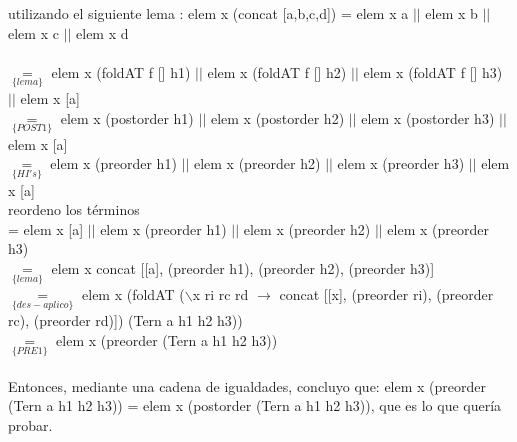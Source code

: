 \documentclass[10pt,a4paper]{article}
\begin{document}
utilizando el siguiente lema : elem x (concat [a,b,c,d]) = elem x a $||$ elem x b $||$ elem x c $||$ elem x d \\
\\
\noindent
$\underset{\{lema\}}{=}$ elem x (foldAT f [] h1) $||$ elem x (foldAT f [] h2) $||$ elem x (foldAT f [] h3) $||$ elem x [a] \\
$\underset{\{POST1\}}{=}$ elem x (postorder h1) $||$ elem x (postorder h2) $||$ elem x (postorder h3) $||$ elem x [a] \\
$\underset{\{HI's\}}{=}$ elem x (preorder h1) $||$ elem x (preorder h2) $||$ elem x (preorder h3) $||$ elem x [a] \\
reordeno los términos \\
= elem x [a] $||$ elem x (preorder h1) $||$ elem x (preorder h2) $||$ elem x (preorder h3)  \\
$\underset{\{lema\}}{=}$ elem x concat [[a], (preorder h1), (preorder h2), (preorder h3)]  \\
$\underset{\{des-aplico\}}{=}$ elem x (foldAT ($\backslash$x ri rc rd $\rightarrow$ concat [[x], (preorder ri), (preorder rc), (preorder rd)]) (Tern a h1 h2 h3))  \\
$\underset{\{PRE1\}}{=}$ elem x (preorder (Tern a h1 h2 h3))  \\
\\
Entonces, mediante una cadena de igualdades, concluyo que: elem x (preorder (Tern a h1 h2 h3)) = elem x (postorder (Tern a h1 h2 h3)), que es lo que quería probar.
\end{document}
